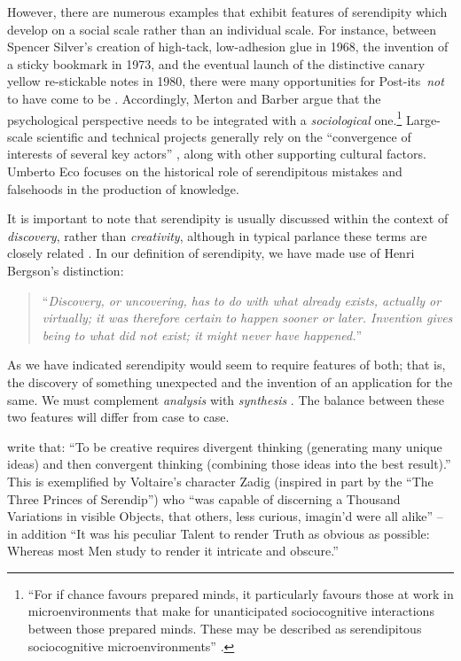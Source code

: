 However, there are numerous examples that exhibit features of
serendipity which develop on a social scale rather than an individual
scale.  For instance, between Spencer Silver's creation of high-tack,
low-adhesion glue in 1968, the invention of a sticky bookmark in 1973,
and the eventual launch of the distinctive canary yellow re-stickable
notes in 1980, there were many opportunities for
Post-its\texttrademark\ \emph{not} to have come to be
\cite{tce-postits}. Accordingly, Merton and Barber argue that the
psychological perspective needs to be integrated with a
\emph{sociological} one.\footnote{ ``For if chance favours prepared
  minds, it particularly favours those at work in microenvironments
  that make for unanticipated sociocognitive interactions between
  those prepared minds. These may be described as serendipitous
  sociocognitive microenvironments'' \cite[p. 259--260]{merton}.}
Large-scale scientific and technical projects generally rely on the
``convergence of interests of several key actors''
\cite{companions-in-geography}, along with other supporting cultural
factors.  Umberto Eco \citeyear{eco2013serendipities} focuses on the
historical role of serendipitous mistakes and falsehoods in the
production of knowledge.

It is important to note that serendipity is usually discussed within
the context of \emph{discovery}, rather than \emph{creativity},
although in typical parlance these terms are closely related
\cite{jordanous12jims}.  In our definition of serendipity, we have
made use of Henri Bergson's distinction:
\begin{quote}
``\emph{Discovery, or uncovering, has to do with what already exists,
    actually or virtually; it was therefore certain to happen sooner
    or later.  Invention gives being to what did not exist; it might
    never have happened.}''~\cite{bergson2010creative}
\end{quote}
As we have indicated serendipity would seem to require features of
both; that is, the discovery of something unexpected and the invention
of an application for the same.  We must complement \emph{analysis}
with \emph{synthesis} \cite{delanda1993virtual}.  The balance between
these two features will differ from case to case.

 write that: ``To be creative requires
divergent thinking (generating many unique ideas) and then convergent
thinking (combining those ideas into the best result).''  This is
exemplified by Voltaire's \citeyear{zadig} character Zadig (inspired
in part by the ``The Three Princes of Serendip'') who ``was capable of
discerning a Thousand Variations in visible Objects, that others, less
curious, imagin’d were all alike'' -- in addition ``It was his
peculiar Talent to render Truth as obvious as possible: Whereas most
Men study to render it intricate and obscure.''
